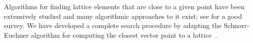 Algorithms for finding lattice elements that are close to a given point have been
extensively studied and many algorithmic approaches to it exist; see
\cite{AgrellEtAl} for a good survey.
%
We have developed a complete search procedure by adapting the Schnorr-Euchner
algorithm for computing the closest vector point to a
lattice~\cite{Schnorr-Euchner}.








